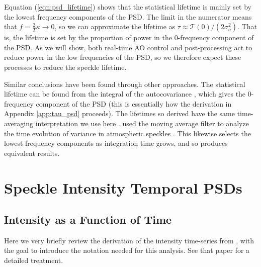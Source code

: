 \documentclass[10pt,preprint]{aastex631}
\begin{document}
Equation (\ref{eqn:psd_lifetime}) shows that the statistical lifetime is mainly set by the lowest frequency components of the PSD.  The limit in the numerator means that $f = \frac{2}{T}\kappa \rightarrow 0$, so we can approximate the lifetime as $\tau \approx \mathcal{T}(0)/(2\sigma_o^2)$.  That is, the lifetime is set by the proportion of power in the 0-frequency component of the PSD.  As we will show, both real-time AO control and post-processing act to reduce power in the low frequencies of the PSD, so we therefore expect these processes to reduce the speckle lifetime.

Similar conclusions have been found through other approaches.  The statistical lifetime can be found from the integral of the autocovariance \citep{1986JOSAA...3.1001A}, which gives the 0-frequency component of the PSD (this is essentially how the derivation in Appendix \ref{app:tau_psd} proceeds).  The lifetimes so derived have the same time-averaging interpretation we use here \citep{2006ApJ...637..541F}.  \citet{2006OExpr..14.7499P} used the moving average filter to analyze the time evolution of variance in atmospheric speckles \citep[see also][]{2005SPIE.5903..170M}.  This likewise selects the lowest frequency components as integration time grows, and so produces equivalent results.

\section{Speckle Intensity Temporal PSDs}
\label{sec:intensity}
\subsection{Intensity as a Function of Time}
Here we very briefly review the derivation of the intensity time-series from \citet{2018JATIS...4a9001M}, with the goal to introduce the notation needed for this analysis.  See that paper for a detailed treatment.
\end{document}
